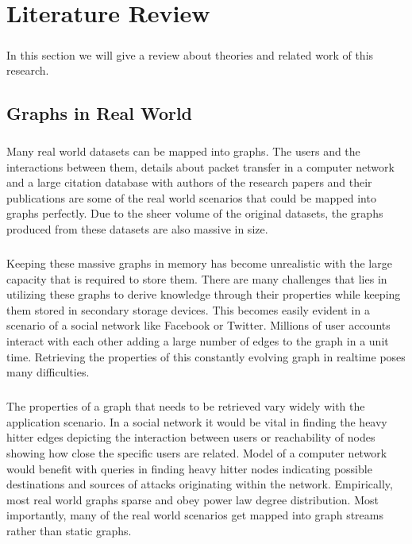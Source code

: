\chapter{Literature Review}

\paragraph{}
In this section we will give a review about theories and related work of this research. 

\section{Graphs in Real World}

\paragraph{}
Many real world datasets can be mapped into graphs. The users and the interactions between them, details about packet transfer in a computer network and a large citation database with authors of the research papers and their publications are some of the real world scenarios that could be mapped into graphs perfectly. Due to the sheer volume of the original datasets, the graphs produced from these datasets are also massive in size. 

\paragraph{}
Keeping these massive graphs in memory has become unrealistic with the large capacity that is required to store them. There are many challenges that lies in utilizing these graphs to derive knowledge through their properties while keeping them stored in secondary storage devices. This becomes easily evident in a scenario of a social network like Facebook or Twitter. Millions of user accounts interact with each other adding a large number of edges to the graph in a unit time. Retrieving the properties of this constantly evolving graph in realtime poses many difficulties. 

\paragraph{}
The properties of a graph that needs to be retrieved vary widely with the application scenario. In a social network it would be vital in finding the heavy hitter edges depicting the interaction between users or reachability of nodes showing how close the specific users are related. Model of a computer network would benefit with queries in finding heavy hitter nodes indicating possible destinations and sources of attacks originating within the network. Empirically, most real world graphs sparse and obey power law degree distribution. Most importantly, many of the real world scenarios get mapped into graph streams rather than static graphs. 


